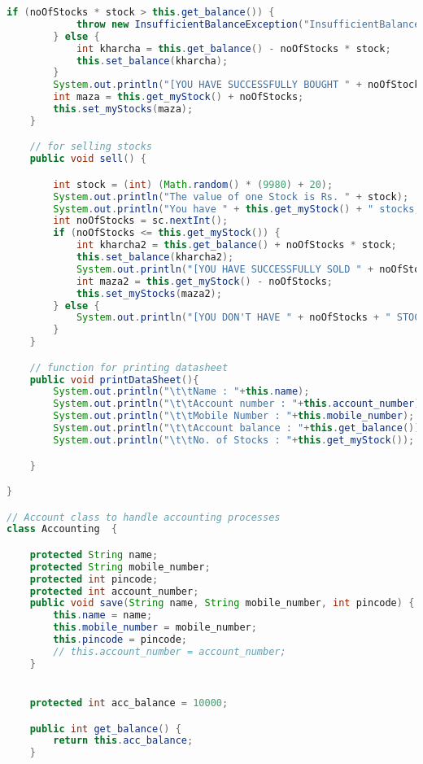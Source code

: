 \documentclass[]{article}
\begin{document}
\begin{lstlisting}[language=java, caption= Java Mini Project ]
        if (noOfStocks * stock > this.get_balance()) {
            throw new InsufficientBalanceException("InsufficientBalanceException : insufficient balance");
        } else {
            int kharcha = this.get_balance() - noOfStocks * stock;
            this.set_balance(kharcha);
        }
        System.out.println("[YOU HAVE SUCCESSFULLY BOUGHT " + noOfStocks + " stocks ]");
        int maza = this.get_myStock() + noOfStocks;
        this.set_myStocks(maza);
    }

    // for selling stocks
    public void sell() {

        int stock = (int) (Math.random() * (9980) + 20);
        System.out.println("The value of one Stock is Rs. " + stock);
        System.out.println("You have " + this.get_myStock() + " stocks, How many do you want to sell");
        int noOfStocks = sc.nextInt();
        if (noOfStocks <= this.get_myStock()) {
            int kharcha2 = this.get_balance() + noOfStocks * stock;
            this.set_balance(kharcha2);
            System.out.println("[YOU HAVE SUCCESSFULLY SOLD " + noOfStocks + " STOCKS]");
            int maza2 = this.get_myStock() - noOfStocks;
            this.set_myStocks(maza2);
        } else {
            System.out.println("[YOU DON'T HAVE " + noOfStocks + " STOCKS ]");
        }
    }

    // function for printing datasheet
    public void printDataSheet(){
        System.out.println("\t\tName : "+this.name);
        System.out.println("\t\tAccount number : "+this.account_number);
        System.out.println("\t\tMobile Number : "+this.mobile_number);
        System.out.println("\t\tAccount balance : "+this.get_balance());
        System.out.println("\t\tNo. of Stocks : "+this.get_myStock());

    }

}

// Account class to handle accounting processes
class Accounting  {

    protected String name;
    protected String mobile_number;
    protected int pincode;
    protected int account_number;
    public void save(String name, String mobile_number, int pincode) {
        this.name = name;
        this.mobile_number = mobile_number;
        this.pincode = pincode;
        // this.account_number = account_number;
    }


    protected int acc_balance = 10000;

    public int get_balance() {
        return this.acc_balance;
    }


\end{lstlisting}
\end{document}
